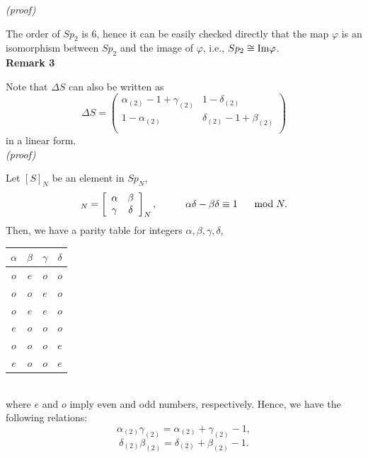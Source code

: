 \documentclass[12pt]{iopart}
\begin{document}
\noindent
{\it (proof)}

The order of \(Sp_2\) is 6, hence it can be easily checked directly
that the map \(\varphi\) is an isomorphism between \(Sp_2\) and the image of \(\varphi\), i.e., \(Sp_2\cong{\rm Im}\varphi\).
\\

\noindent
{\bf Remark 3}
\vspace{2mm}

Note that \(\Delta S\) can also be written as
\begin{equation}
\Delta S
=
\left(\begin{array}{cc}\alpha_{(2)}-1+\gamma_{(2)}&1-\delta_{(2)}\\1-\alpha_{(2)}&\delta_{(2)}-1+\beta_{(2)}\\\end{array}\right)
\end{equation}
in a linear form.
\\

\noindent
{\it (proof)}

Let
\([S]_N\) be an element in \(Sp_N\),
\begin{equation}
[S]_N=
\left[\begin{array}{cc}
\alpha & \beta \\\relax
\gamma & \delta \\
\end{array}\right]_N,
\hspace{10mm}
\alpha\delta-\beta\delta\equiv1
\hspace{5mm}\bmod N.
\end{equation}
%
Then,
we have a parity table for integers \(\alpha,\beta, \gamma, \delta\), \\

\begin{center}
\begin{tabular}{cccc}
\hline
 \(\alpha\) & \(\beta\) & \(\gamma\) & \(\delta\) \\
\hline
 \(o\) & \(e\) & \(o\) & \(o\) \\
 \(o\) & \(o\) & \(e\) & \(o\) \\
 \(o\) & \(e\) & \(e\) & \(o\) \\
 \(e\) & \(o\) & \(o\) & \(o\) \\
 \(o\) & \(o\) & \(o\) & \(e\) \\
 \(e\) & \(o\) & \(o\) & \(e\) \\
\hline
\end{tabular}
\end{center}
\ \\
\noindent
where \(e\) and \(o\) imply even and odd numbers, respectively.
%
Hence, we have the following relations:
\begin{equation}
\alpha_{(2)}\gamma_{(2)}= \alpha_{(2)}+\gamma_{(2)}-1,
\end{equation}
\begin{equation}
\delta_{(2)}\beta_{(2)}= \delta_{(2)}+\beta_{(2)}-1.
\end{equation}
\ \\
\end{document}
